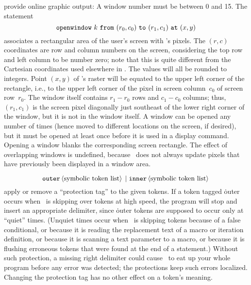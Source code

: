  provide online graphic output:
A window number must be between 0 and 15. The statement
$$\hbox{\.{openwindow} $k$ \.{from} $(r_0,c_0)$ \.{to}
 $(r_1,c_1)$ \.{at} $(x,y)$}$$
associates a rectangular area of the user's screen with \MF's pixels.
The $(r,c)$ coordinates are row and column numbers on the screen,
considering the top row and left column to be number zero; note that this
is quite different from the Cartesian coordinates used elsewhere in \MF.
The values will all be rounded to integers. Point $(x,y)$ of \MF's
raster will be equated to the upper left corner of the rectangle, i.e.,
to the upper left corner of the pixel in screen column~$c_0$ of screen
row~$r_0$.  The window itself contains $r_1-r_0$ rows and $c_1-c_0$
columns; thus, $(r_1,c_1)$ is the screen pixel diagonally just southeast of
the lower right corner of the window, but it is not in the window itself.
A window can be opened any number of times (hence moved to different
locations on the screen, if desired), but it must be opened at least once
before it is used in a \.{display} command.
Opening a window blanks the corresponding screen rectangle.
The effect of overlapping windows is undefined, because \MF\ does not
always update pixels that have previously been displayed in a window area.

$$\hbox{\.{outer}\<symbolic token list>\alt\.{inner}\<symbolic token list>}$$
apply or remove a ``protection tag'' to the given tokens. If a token
tagged \.{outer} occurs when \MF\ is skipping over tokens at high speed,
the program will stop and insert an appropriate delimiter, since \.{outer}
tokens are supposed to occur only at ``quiet'' times. (Unquiet times
occur when \MF\ is skipping tokens because of a false conditional,
or because it is reading the replacement text of a macro
or iteration definition, or because it is scanning a text parameter to
a macro, or because it is flushing erroneous tokens that were found
at the end of a statement.) Without such protection, a missing right
delimiter could cause \MF\ to eat up your whole program before any
error was detected; the protections keep such errors localized.
Changing the protection tag has no other effect on a token's meaning.

